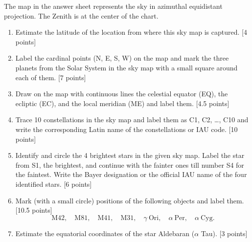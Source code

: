 The map in the answer sheet represents the sky in azimuthal equidistant projection. The Zenith is at the center of the chart.
\begin{enumerate}
\item Estimate the latitude of the location from where this sky map is captured. \hfill[4 points]
\item Label the cardinal points (N, E, S, W) on the map and mark the three planets from the Solar System in the sky map with a small square around each of them. \hfill[7 points]
\item Draw on the map with continuous lines the celestial equator (EQ), the ecliptic (EC), and the local meridian (ME) and label them. \hfill[4.5 points]
\item Trace 10 constellations in the sky map and label them as C1, C2, \ldots, C10 and write the corresponding Latin name of the constellations or IAU code. \hfill[10 points]
\item Identify and circle the 4 brightest stars in the given sky map. Label the star from S1, the brightest, and continue with the fainter ones till number S4 for the faintest. Write the Bayer designation or the official IAU name of the four identified stars. \hfill[6 points]
\item Mark (with a small circle) positions of the following objects and label them. \hfill[10.5 points]
\[\mathrm{M42},\quad\mathrm{M81},\quad\mathrm{M41},\quad\mathrm{M31},\quad\gamma\ \mathrm{Ori},\quad\alpha\ \mathrm{Per},\quad\alpha\ \mathrm{Cyg}.\]
\item Estimate the equatorial coordinates of the star Aldebaran ($\alpha$ Tau). \hfill[3 points]
\end{enumerate}
